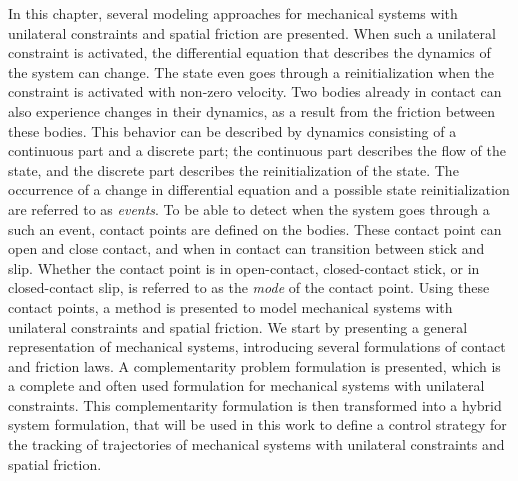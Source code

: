 \documentclass[../DC2017114Bouma.tex]{subfiles}
\begin{document}
In this chapter, several modeling approaches for mechanical systems with unilateral constraints and spatial friction are presented. When such a unilateral constraint is activated, the differential equation that describes the dynamics of the system can change. The state even goes through a reinitialization when the constraint is activated with non-zero velocity. Two bodies already in contact can also experience changes in their dynamics, as a result from the friction between these bodies. This behavior can be described by dynamics consisting of a continuous part and a discrete part; the continuous part describes the flow of the state, and the discrete part describes the reinitialization of the state. The occurrence of a change in differential equation and a possible state reinitialization are referred to as \textit{events}. To be able to detect when the system goes through a such an event, contact points are defined on the bodies. These contact point can open and close contact, and when in contact can transition between stick and slip. Whether the contact point is in open-contact, closed-contact stick, or in closed-contact slip, is referred to as the \textit{mode} of the contact point. Using these contact points, a method is presented to model mechanical systems with unilateral constraints and spatial friction. We start by presenting a general representation of mechanical systems, introducing several formulations of contact and friction laws. A complementarity problem formulation is presented, which is a complete and often used formulation for mechanical systems with unilateral constraints. This complementarity formulation is then transformed into a hybrid system formulation, that will be used in this work to define a control strategy for the tracking of trajectories of mechanical systems with unilateral constraints and spatial friction.
\end{document}

